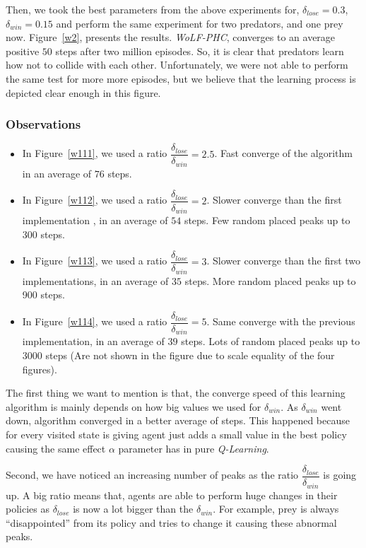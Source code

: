 \documentclass[a4paper,11pt]{article}
\begin{document}
Then, we took the best parameters from the above experiments for, $\delta_{lose} = 0.3$, $\delta_{win} = 0.15$ and perform the same experiment for two predators, and one prey now. Figure~\ref{w2}, presents the results. \textit{WoLF-PHC}, converges to an average positive $50$ steps after two million episodes. So, it is clear that predators learn how not to collide with each other. Unfortunately, we were not able to perform the same test for more more episodes, but we believe that the learning process is depicted clear enough in this figure.

\subsubsection{Observations}
\begin{itemize}
\item In Figure~\ref{w111}, we used a ratio $\dfrac{\delta_{lose}}{\delta_{win}} = 2.5$. Fast converge of the algorithm in an average of $76$ steps.
\item In Figure~\ref{w112}, we used a ratio $\dfrac{\delta_{lose}}{\delta_{win}} = 2$. Slower converge than the first implementation , in an average of $54$ steps. Few random placed peaks up to 300 steps.
\item In Figure~\ref{w113}, we used a ratio $\dfrac{\delta_{lose}}{\delta_{win}} = 3$. Slower converge than the first two implementations, in an average of $35$ steps. More random placed peaks up to 900 steps.
\item In Figure~\ref{w114}, we used a ratio $\dfrac{\delta_{lose}}{\delta_{win}} = 5$. Same converge with the previous implementation, in an average of $39$ steps. Lots of random placed peaks up to 3000 steps (Are not shown in the figure due to scale equality of the four figures).
\end{itemize}

The first thing we want to mention is that, the converge speed of this learning algorithm is mainly depends on how big values we used for $\delta_{win}$. As $\delta_{win}$ went down, algorithm converged in a better average of steps. This happened because for every visited state is giving agent just adds a small value in the best policy causing the same effect $\alpha$ parameter has in pure \textit{Q-Learning}.

Second, we have noticed an increasing number of peaks as the ratio $\dfrac{\delta_{lose}}{\delta_{win}}$ is going up. A big ratio means that, agents are able to perform huge changes in their policies as $\delta_{lose}$ is now a lot bigger than the $\delta_{win}$. For example, prey is always ``disappointed'' from its policy and tries to change it causing these abnormal peaks.
\end{document}

